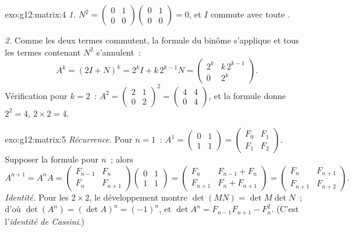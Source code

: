 \begin{solution}{exo:g12:matrix:4}
\emph{1.} $N^2 = \begin{pmatrix} 0&1\\0&0\end{pmatrix}
\begin{pmatrix} 0&1\\0&0\end{pmatrix} = 0$, et $I$ commute avec toute
.

\emph{2.} Comme les deux termes commutent, la formule du binôme
s'applique et tous les termes contenant $N^2$ s'annulent~:
\[
A^k = (2I + N)^k = 2^k I + k\,2^{k-1} N
= \begin{pmatrix} 2^k & k\,2^{k-1}\\ 0 & 2^k \end{pmatrix}.
\]
Vérification pour $k = 2$~:
$A^2 = \begin{pmatrix} 2&1\\0&2\end{pmatrix}^2
= \begin{pmatrix} 4&4\\0&4\end{pmatrix}$, et la formule donne
$2^2 = 4$, $2 \times 2 = 4$. \checkmark
\end{solution}

\begin{solution}{exo:g12:matrix:5}
\emph{Récurrence.} Pour $n = 1$~:
$A^1 = \begin{pmatrix} 0&1\\1&1\end{pmatrix}
= \begin{pmatrix} F_0 & F_1\\ F_1 & F_2\end{pmatrix}$. Supposer la
formule pour $n$~; alors
\[
A^{n+1} = A^n A
= \begin{pmatrix} F_{n-1} & F_n\\ F_n & F_{n+1}\end{pmatrix}
\begin{pmatrix} 0 & 1\\ 1 & 1\end{pmatrix}
= \begin{pmatrix} F_n & F_{n-1} + F_n\\ F_{n+1} & F_n + F_{n+1}\end{pmatrix}
= \begin{pmatrix} F_n & F_{n+1}\\ F_{n+1} & F_{n+2}\end{pmatrix}.
\]
\emph{Identité.} Pour les  $2\times2$, le développement montre
$\det(MN) = \det M \det N$~; d'où
$\det(A^n) = (\det A)^n = (-1)^n$, et
$\det A^n = F_{n-1}F_{n+1} - F_n^2$. (C'est l'\emph{identité de Cassini}.)
\end{solution}


